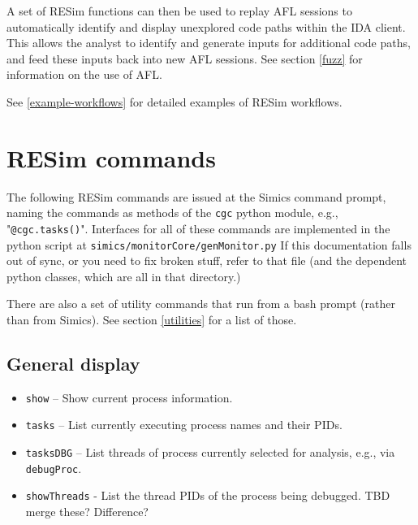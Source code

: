 \documentclass[titlepage]{article}
\begin{document}
A set of RESim functions can then be used to replay AFL sessions to automatically identify and display unexplored code paths within
the IDA client.  This allows the analyst to identify and generate inputs for additional code paths, and feed these inputs back into 
new AFL sessions.  See section \ref{fuzz} for information on the use of AFL.

See \ref{example-workflows} for detailed examples of RESim workflows.


\section{RESim commands}
\label{commands}
The following RESim commands are issued at the Simics command prompt, naming the commands as methods of the {\tt cgc} python module,
e.g., "{\tt @cgc.tasks()}".  Interfaces for all of these commands are implemented in the python script at {\tt simics/monitorCore/genMonitor.py}
If this documentation falls out of sync, or you need to fix broken stuff, refer to that file (and the dependent python classes, which are all in that directory.)

There are also a set of utility commands that run from a bash prompt (rather than from Simics).  See section \ref{utilities} for a list of those.

\label{commands}
\subsection{General display}
\begin{itemize}
\item {\tt show} -- Show current process information.
\item {\tt tasks} -- List currently executing process names and their PIDs.
\item {\tt tasksDBG} -- List threads of process currently selected for analysis, e.g., via {\tt debugProc}.
\item {\tt showThreads} - List the thread PIDs of the process being debugged.  TBD merge these? Difference?
\end{itemize}
\end{document}

